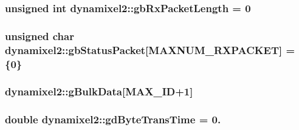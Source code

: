 \subsubsection[{gb\+Rx\+Packet\+Length}]{\setlength{\rightskip}{0pt plus 5cm}unsigned int dynamixel2\+::gb\+Rx\+Packet\+Length = 0\hspace{0.3cm}{\ttfamily [private]}}\label{classdynamixel2_a7ae9bffcc9f4b087c57640881ccbb378}
\hypertarget{classdynamixel2_a0776f210a190cf57d1a6faf9697a593d}{}
\subsubsection[{gb\+Status\+Packet}]{\setlength{\rightskip}{0pt plus 5cm}unsigned char dynamixel2\+::gb\+Status\+Packet\mbox{[}{\bf M\+A\+X\+N\+U\+M\+\_\+\+R\+X\+P\+A\+C\+K\+E\+T}\mbox{]} = \{0\}\hspace{0.3cm}{\ttfamily [private]}}\label{classdynamixel2_a0776f210a190cf57d1a6faf9697a593d}
\hypertarget{classdynamixel2_a5083923283d17a820b3deb940c7211a5}{}
\subsubsection[{g\+Bulk\+Data}]{ dynamixel2\+::g\+Bulk\+Data\mbox{[}{\bf M\+A\+X\+\_\+\+I\+D}+1\mbox{]}\hspace{0.3cm}{\ttfamily [private]}}\label{classdynamixel2_a5083923283d17a820b3deb940c7211a5}
\hypertarget{classdynamixel2_a786e818a88ec65d3b7e2f30b55ec31ba}{}
\subsubsection[{gd\+Byte\+Trans\+Time}]{\setlength{\rightskip}{0pt plus 5cm}double dynamixel2\+::gd\+Byte\+Trans\+Time = 0.\hspace{0.3cm}{\ttfamily [private]}}\label{classdynamixel2_a786e818a88ec65d3b7e2f30b55ec31ba}
\hypertarget{classdynamixel2_ac9746f2c7ed6d706152d6d0d502993c0}{}

